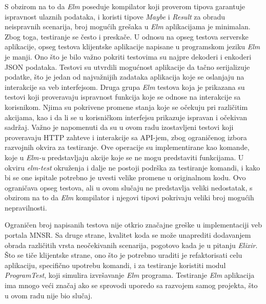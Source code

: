 \documentclass[12pt,oneside]{memoir}
\begin{document}
\par S obzirom na to da \emph{Elm} poseduje kompilator koji proverom tipova garantuje ispravnost ulaznih podataka, i koristi tipove \emph{Maybe} i \emph{Result} za obradu neispravnih scenarija, broj mogućih grešaka u \emph{Elm} aplikacijama je minimalan. Zbog toga, testiranje se često i preskače. U odnosu na opseg testova serverske aplikacije, opseg testova klijentske aplikacije napisane u programskom jeziku \emph{Elm} je manji. Ono što je bilo važno pokriti testovima su najpre dekoderi i enkoderi JSON podataka. Testovi su utvrdili mogućnost aplikacije da tačno serijalizuje podatke, što je jedan od najvažnijih zadataka aplikacija koje se oslanjaju na interakcije sa veb interfejsom. Druga grupa \emph{Elm} testova koja je prikazana su testovi koji proveravaju ispravnost funkcija koje se odnose na interakcije sa korisnikom. Njima su pokrivene promene stanja koje se očekuju pri različitim akcijama, kao i da li se u korisničkom interfejsu prikazuje ispravan i očekivan sadržaj. Važno je napomenuti da su u ovom radu izostavljeni testovi koji proveravaju HTTP zahteve i interakcije sa API-jem, zbog ograničenog izbora razvojnih okvira za testiranje. Ove operacije su implementirane kao komande, koje u \emph{Elm-u} predstavljaju akcije koje se ne mogu predstaviti funkcijama. U okviru \emph{elm-test} okruženja i dalje ne postoji podrška za testiranje komandi, i kako bi se one ispitale potrebno je uvesti velike promene u originalnom kodu. Ovo ograničava opseg testova, ali u ovom slučaju ne predstavlja veliki nedostatak, s obzirom na to da \emph{Elm} kompilator i njegovi tipovi pokrivaju veliki broj mogućih nepravilnosti. 
\par Ograničen broj napisanih testova nije otkrio značajne greške u implementaciji veb portala MNSR. Sa druge strane, kvalitet koda se može unaprediti dodavanjem obrada različitih vrsta neočekivanih scenarija, pogotovo kada je u pitanju \emph{Elixir}. Što se tiče klijentske strane, ono što je potrebno uraditi je refaktorisati celu aplikaciju, specifično upotrebu komandi, i za testiranje koristiti modul \emph{ProgramTest}, koji simulira izvršavanje \emph{Elm} programa. Testiranje \emph{Elm} aplikacija ima mnogo veći značaj ako se sprovodi uporedo sa razvojem samog projekta, što u ovom radu nije bio slučaj. 


\literatura
\end{document}
